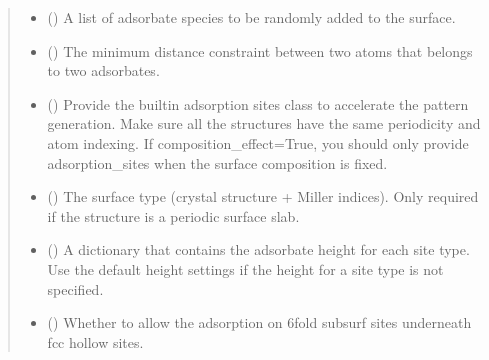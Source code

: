 \documentclass[letterpaper,10pt,english]{sphinxmanual}
\begin{document}
\begin{fulllineitems}
\begin{quote}
\begin{description}
\begin{itemize}
\item {} 
 () \textendash{} A list of adsorbate species to be randomly added to the surface.

\item {} 
 (\sphinxstyleliteralemphasis{\sphinxupquote{, }}) \textendash{} The minimum distance constraint between two atoms that belongs
to two adsorbates.

\item {} 
 (\sphinxstyleliteralemphasis{\sphinxupquote{, }}) \textendash{} Provide the built\sphinxhyphen{}in adsorption sites class to accelerate the
pattern generation. Make sure all the structures have the same
periodicity and atom indexing. If composition\_effect=True, you
should only provide adsorption\_sites when the surface composition
is fixed.

\item {} 
 (\sphinxstyleliteralemphasis{\sphinxupquote{, }}) \textendash{} The surface type (crystal structure + Miller indices).
Only required if the structure is a periodic surface slab.

\item {} 
 (\sphinxstyleliteralemphasis{\sphinxupquote{, }}) \textendash{} A dictionary that contains the adsorbate height for each site
type. Use the default height settings if the height for a site
type is not specified.

\item {} 
 (\sphinxstyleliteralemphasis{\sphinxupquote{, }}) \textendash{} Whether to allow the adsorption on 6\sphinxhyphen{}fold subsurf sites
underneath fcc hollow sites.


\end{itemize}
\end{description}
\end{quote}
\end{fulllineitems}
\end{document}

